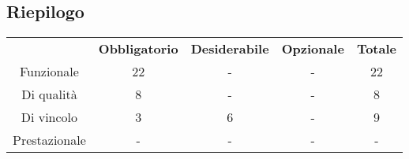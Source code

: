 \subsection{Riepilogo}
\begin{table}[H]
    \centering
    \renewcommand{\arraystretch}{1.8}
        \begin{tabular}{c | c | c | c | c }
            \rowcolor[HTML]{a52a2a}
            \multicolumn{1}{c}{\color[HTML]{FFFFFF} \textbf{Tipologia}}          &
            \multicolumn{1}{c}{\color[HTML]{FFFFFF} \textbf{Obbligatorio}} &
            \multicolumn{1}{c}{\color[HTML]{FFFFFF} \textbf{Desiderabile}}     &
            \multicolumn{1}{c}{\color[HTML]{FFFFFF} \textbf{Opzionale}}      &
            \multicolumn{1}{c}{\color[HTML]{FFFFFF} \textbf{Totale}}
            \\

    Funzionale & 22 & - & - & 22 \\
    Di qualità & 8 & - & - & 8 \\
    Di vincolo & 3 & 6 & - & 9 \\
    Prestazionale & - & - & - & - \\

\end{tabular}
    \end{table}